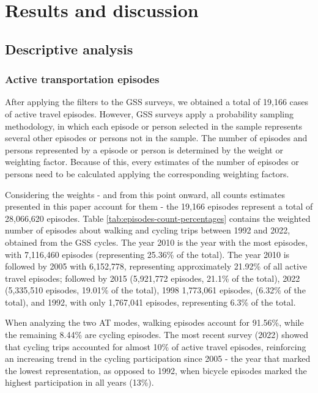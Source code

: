 \documentclass[preprint, 3p,
authoryear]{elsarticle} %
\begin{document}
\section{Results and discussion}\label{results-and-discussion}

\subsection{Descriptive analysis}\label{descriptive-analysis}

\subsubsection{Active transportation
episodes}\label{active-transportation-episodes}

After applying the filters to the GSS surveys, we obtained a total of
19,166 cases of active travel episodes. However, GSS surveys apply a
probability sampling methodology, in which each episode or person
selected in the sample represents several other episodes or persons not
in the sample. The number of episodes and persons represented by a
episode or person is determined by the weight or weighting factor.
Because of this, every estimates of the number of episodes or persons
need to be calculated applying the corresponding weighting factors.

Considering the weights - and from this point onward, all counts
estimates presented in this paper account for them - the 19,166 episodes
represent a total of 28,066,620 episodes. Table
\ref{tab:episodes-count-percentages} contains the weighted number of
episodes about walking and cycling trips between 1992 and 2022, obtained
from the GSS cycles. The year 2010 is the year with the most episodes,
with 7,116,460 episodes (representing 25.36\% of the total). The year
2010 is followed by 2005 with 6,152,778, representing approximately
21.92\% of all active travel episodes; followed by 2015 (5,921,772
episodes, 21.1\% of the total), 2022 (5,335,510 episodes, 19.01\% of the
total), 1998 1,773,061 episodes, (6.32\% of the total), and 1992, with
only 1,767,041 episodes, representing 6.3\% of the total.

When analyzing the two AT modes, walking episodes account for 91.56\%,
while the remaining 8.44\% are cycling episodes. The most recent survey
(2022) showed that cycling trips accounted for almost 10\% of active
travel episodes, reinforcing an increasing trend in the cycling
participation since 2005 - the year that marked the lowest
representation, as opposed to 1992, when bicycle episodes marked the
highest participation in all years (13\%).
\end{document}
